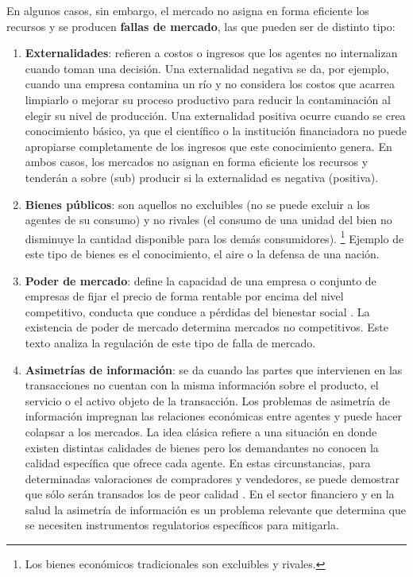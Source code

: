 \documentclass[
  12pt,
  spanish,
]{book}
\begin{document}
En algunos casos, sin embargo, el mercado no asigna en forma eficiente
los recursos y se producen \textbf{fallas de mercado}, las que pueden
ser de distinto tipo:

\begin{enumerate}
\def\labelenumi{\arabic{enumi}.}
\item
  \textbf{Externalidades}: refieren a costos o ingresos que los agentes
  no internalizan cuando toman una decisión. Una externalidad negativa
  se da, por ejemplo, cuando una empresa contamina un río y no considera
  los costos que acarrea limpiarlo o mejorar su proceso productivo para
  reducir la contaminación al elegir su nivel de producción. Una
  externalidad positiva ocurre cuando se crea conocimiento básico, ya
  que el científico o la institución financiadora no puede apropiarse
  completamente de los ingresos que este conocimiento genera. En ambos
  casos, los mercados no asignan en forma eficiente los recursos y
  tenderán a sobre (sub) producir si la externalidad es negativa
  (positiva).
\item
  \textbf{Bienes públicos}: son aquellos no excluibles (no se puede
  excluir a los agentes de su consumo) y no rivales (el consumo de una
  unidad del bien no disminuye la cantidad disponible para los demás
  consumidores). \footnote{Los bienes económicos tradicionales son
    excluibles y rivales.} Ejemplo de este tipo de bienes es el
  conocimiento, el aire o la defensa de una nación.
\item
  \textbf{Poder de mercado}: define la capacidad de una empresa o
  conjunto de empresas de fijar el precio de forma rentable por encima
  del nivel competitivo, conducta que conduce a pérdidas del bienestar
  social \citep[p.~8]{Carlton2004}. La existencia de poder de mercado
  determina mercados no competitivos. Este texto analiza la regulación
  de este tipo de falla de mercado.
\item
  \textbf{Asimetrías de información}: se da cuando las partes que
  intervienen en las transacciones no cuentan con la misma información
  sobre el producto, el servicio o el activo objeto de la transacción.
  Los problemas de asimetría de información impregnan las relaciones
  económicas entre agentes y puede hacer colapsar a los mercados. La
  idea clásica refiere a una situación en donde existen distintas
  calidades de bienes pero los demandantes no conocen la calidad
  específica que ofrece cada agente. En estas circunstancias, para
  determinadas valoraciones de compradores y vendedores, se puede
  demostrar que sólo serán transados los de peor calidad
  \citep[pp.~244-245]{Wolfstetter1999}. En el sector financiero y en la
  salud la asimetría de información es un problema relevante que
  determina que se necesiten instrumentos regulatorios específicos para
  mitigarla.
\end{enumerate}
\end{document}
